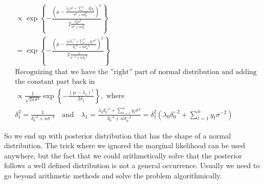 \documentclass[12pt,a4paper,leqno]{report}
\theoremstyle{plain}
\theoremstyle{definition}
\theoremstyle{remark}
\begin{document}
\begin{align}
             & \propto
    \exp{
        \left \{
        -
        \frac{
            \left(
            \mu
            -
            \frac{
                \lambda_0 \sigma^2 + \sum_{t=1}^{n} \delta_0^2 y_t
            }
            {
                \sigma^2 + n \delta_0^2
            }
            \right)^2
        }
        {
            2 \frac{
                \delta_0^2 \sigma^2
            }
            {\sigma^2 + n \delta_0^2}
        }
        \right \}
    } \nonumber                                                                                               \\
             & =
    \exp{
        \left \{
        -
        \frac{
            \left(
            \mu
            -
            \frac{
                \lambda_0 \delta_0^{-2} + \sum_{t=1}^{n} y_t \sigma^2
            }
            {
                \delta_0^{-2} + n \sigma_0^{-2}
            }
            \right)^2
        }
        {
            2 \frac{1}
            {
                \sigma^{-2} + n \delta_0^{-2}
            }
        }
        \right \}
    } \nonumber                                                                                               \\
             & \text{Recognizing that we have the ''right'' part of normal distribution and adding} \nonumber \\
             & \text{the constant part back in} \nonumber                                                     \\
             & \propto
    \frac{1}
    {{\sqrt {2\pi \sigma^2} }}
    \exp{
        \left \{
        -
        \frac{
            \left( \mu - \lambda_1 \right)^2
        }
        {
            2 \delta_1
        }
        \right \}
    }, \text{ where } \nonumber                                                                               \\
             & \delta_1^2
    =
    \frac{1}{\delta_0^{-2}+n\delta^{-2}}
    \quad\text{and}\quad
    \lambda_1
    =
    \frac{
        \lambda_0 \delta_0^{-2} + \sum_{t=1}^{n} y_t \sigma^2
    }
    {
        \delta_0^{-2} + n \sigma_0^{-2}
    }
    =
    \delta_1^2
    \left(
    \lambda_0 \delta_0^{-2} + \sum_{t=1}^{n} y_t \sigma^{-2}
    \right) \nonumber
\end{align}

So we end up with posterior distribution that has the shape of a normal distribution. The
trick where we ignored the marginal likelihood can be used anywhere, but the fact that we
could arithmetically solve that the posterior follows a well defined distribution is not
a general occurrence. Usually we need to go beyond arithmetic methods and solve the
problem algorithmically.
\end{document}
